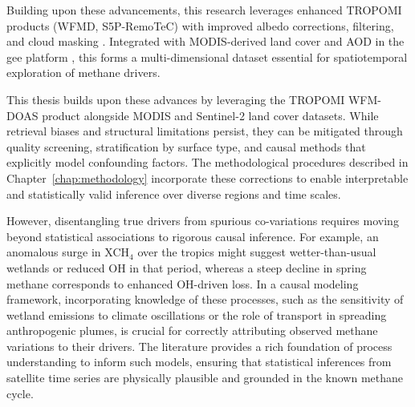 Building upon these advancements, this research leverages enhanced TROPOMI products (WFMD, S5P-RemoTeC) with improved albedo corrections, filtering, and cloud masking \cite{rajnauth_monetizing_2008}. Integrated with MODIS-derived land cover and AOD in the \gls{gee} platform \cite{Gorelick2017}, this forms a multi-dimensional dataset essential for spatiotemporal exploration of methane drivers.

This thesis builds upon these advances by leveraging the TROPOMI WFM-DOAS product alongside MODIS and Sentinel-2 land cover datasets. While retrieval biases and structural limitations persist, they can be mitigated through quality screening, stratification by surface type, and causal methods that explicitly model confounding factors. The methodological procedures described in Chapter~\ref{chap:methodology} incorporate these corrections to enable interpretable and statistically valid inference over diverse regions and time scales.

However, disentangling true drivers from spurious co-variations requires moving beyond statistical associations to rigorous causal inference. For example, an anomalous surge in XCH$_4$ over the tropics might suggest wetter-than-usual wetlands or reduced OH in that period, whereas a steep decline in spring methane corresponds to enhanced OH-driven loss. In a causal modeling framework, incorporating knowledge of these processes, such as the sensitivity of wetland emissions to climate oscillations or the role of transport in spreading anthropogenic plumes, is crucial for correctly attributing observed methane variations to their drivers. The literature provides a rich foundation of process understanding to inform such models, ensuring that statistical inferences from satellite time series are physically plausible and grounded in the known methane cycle.






